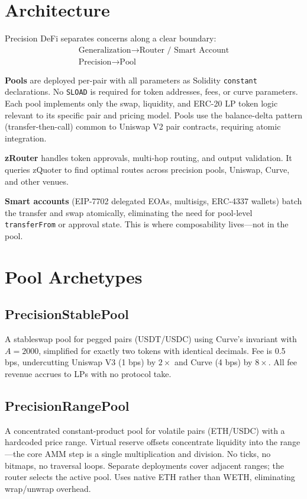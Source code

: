\documentclass[10pt,twocolumn]{article}
\begin{document}
\section{Architecture}

Precision DeFi separates concerns along a clear boundary:
\begin{gather*}
\text{Generalization} \rightarrow \text{Router / Smart Account} \\
\text{Precision} \rightarrow \text{Pool}
\end{gather*}

\textbf{Pools} are deployed per-pair with all parameters as Solidity \texttt{constant} declarations. No \texttt{SLOAD} is required for token addresses, fees, or curve parameters. Each pool implements only the swap, liquidity, and ERC-20 LP token logic relevant to its specific pair and pricing model. Pools use the balance-delta pattern (transfer-then-call) common to Uniswap V2 pair contracts, requiring atomic integration.

\textbf{zRouter} handles token approvals, multi-hop routing, and output validation. It queries zQuoter to find optimal routes across precision pools, Uniswap, Curve, and other venues.

\textbf{Smart accounts} (EIP-7702 delegated EOAs, multisigs, ERC-4337 wallets) batch the transfer and swap atomically, eliminating the need for pool-level \texttt{transferFrom} or approval state. This is where composability lives---not in the pool.

\section{Pool Archetypes}

\subsection{PrecisionStablePool}

A stableswap pool for pegged pairs (USDT/USDC) using Curve's invariant with $A = 2000$, simplified for exactly two tokens with identical decimals. Fee is 0.5 bps, undercutting Uniswap V3 (1 bps) by $2\times$ and Curve (4 bps) by $8\times$. All fee revenue accrues to LPs with no protocol take.

\subsection{PrecisionRangePool}

A concentrated constant-product pool for volatile pairs (ETH/USDC) with a hardcoded price range. Virtual reserve offsets concentrate liquidity into the range---the core AMM step is a single multiplication and division. No ticks, no bitmaps, no traversal loops. Separate deployments cover adjacent ranges; the router selects the active pool. Uses native ETH rather than WETH, eliminating wrap/unwrap overhead.
\end{document}
